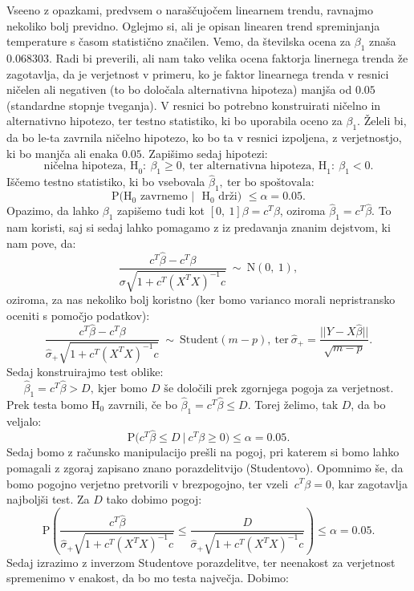 \documentclass{article}
\begin{document}
Vseeno z opazkami, predvsem o naraščujočem linearnem trendu, ravnajmo nekoliko bolj previdno. 
Oglejmo si, ali je opisan linearen trend spreminjanja temperature s časom statistično značilen. 
\newline
Vemo, da številska ocena za $\beta_{1}$ znaša $0.068303$. 
Radi bi preverili, ali nam tako velika ocena faktorja linernega trenda že zagotavlja, da je verjetnost v primeru, ko je faktor linearnega trenda v resnici ničelen ali negativen (to bo določala alternativna hipoteza) manjša od $0.05$ (standardne stopnje tveganja). 
V resnici bo potrebno konstruirati ničelno in alternativno hipotezo, ter testno statistiko, ki bo uporabila oceno za $\beta_1$. Želeli bi, da bo le-ta zavrnila ničelno hipotezo, ko bo ta v resnici izpoljena, z verjetnostjo, ki bo manjča ali enaka $0.05$. 
\newline
Zapišimo sedaj hipotezi:
$$
\text{ničelna hipoteza, H}_0:~\beta_1 \geq 0,~\text{ter alternativna hipoteza, H}_1:~\beta_1 < 0.
$$
Iščemo testno statistiko, ki bo vsebovala $\hat{\beta}_1,~\text{ter bo spoštovala:}$
$$
\text{P($\text{H}_0$ zavrnemo $|$ $\text{H}_0$ drži) $\leq \alpha = 0.05$}. 
$$
Opazimo, da lahko $\beta_1$ zapišemo tudi kot $[0,~1]\beta = c^T\beta$, oziroma $\hat{\beta}_1 = c^T\hat{\beta}$.
To nam koristi, saj si sedaj lahko pomagamo z iz predavanja znanim dejstvom, ki nam pove, da:
$$
    \frac{c^T\hat{\beta} - c^T \beta}{\sigma\sqrt{1 + c^T(X^TX)^{-1}c}}~\sim~\text{N}(0,~1), 
$$
oziroma, za nas nekoliko bolj koristno (ker bomo varianco morali nepristransko oceniti s pomočjo podatkov):
$$
\frac{c^T\hat{\beta} - c^T \beta}{\hat{\sigma}_{+}\sqrt{1 + c^T(X^TX)^{-1}c}}~\sim~\text{Student}(m - p),~\text{ter}~ \hat{\sigma}_{+} = \frac{||Y - X\hat{\beta}||}{\sqrt{m - p}}.
$$
Sedaj konstruirajmo test oblike:
$$
    {\hat{\beta}_1 = c^T\hat{\beta}} > D,~\text{kjer bomo $D$ še določili prek zgornjega pogoja za verjetnost}.
$$
Prek testa bomo $\text{H}_0$ zavrnili, če bo ${\hat{\beta}_1 = c^T\hat{\beta}} \leq D$. Torej želimo, tak $D$, da bo veljalo:
$$
\text{P$(c^T\hat{\beta}$} \leq D~|~c^T\beta \geq 0)\leq \alpha = 0.05. 
$$
Sedaj bomo z računsko manipulacijo prešli na pogoj, pri katerem si bomo lahko pomagali z zgoraj zapisano znano porazdelitvijo (Studentovo). 
Opomnimo še, da bomo pogojno verjetno pretvorili v brezpogojno, ter vzeli $~c^T\beta = 0$, kar zagotavlja najboljši test. 
Za $D$ tako dobimo pogoj:
$$
\text{P}\left(\frac{c^T\hat{\beta}}{\hat{\sigma}_{+}\sqrt{1 + c^T(X^TX)^{-1}c}} \leq \frac{D}{\hat{\sigma}_{+}\sqrt{1 + c^T(X^TX)^{-1}c}}\right)\leq \alpha = 0.05. 
$$
Sedaj izrazimo z inverzom Studentove porazdelitve, ter neenakost za verjetnost spremenimo v enakost, da bo mo testa največja. Dobimo:
\end{document}
